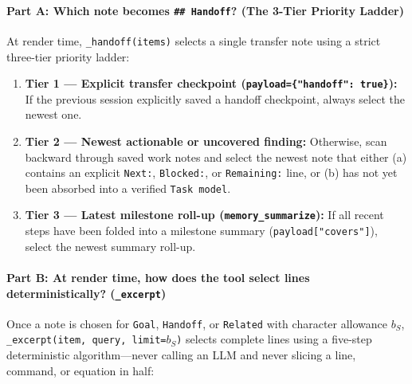 \documentclass[11pt,a4paper]{article}
\begin{document}
\paragraph{Part A: Which note becomes \texttt{\#\# Handoff}? (The 3-Tier Priority Ladder)}
At render time, \texttt{\_handoff(items)} selects a single transfer note using a strict three-tier priority ladder:
\begin{enumerate}[leftmargin=1.6em,itemsep=2pt]
  \item \textbf{Tier 1 --- Explicit transfer checkpoint (\texttt{payload=\{"handoff": true\}}):} If the previous session explicitly saved a handoff checkpoint, always select the newest one.
  \item \textbf{Tier 2 --- Newest actionable or uncovered finding:} Otherwise, scan backward through saved work notes and select the newest note that either (a) contains an explicit \texttt{Next:}, \texttt{Blocked:}, or \texttt{Remaining:} line, or (b) has not yet been absorbed into a verified \texttt{Task model}.
  \item \textbf{Tier 3 --- Latest milestone roll-up (\texttt{memory\_summarize}):} If all recent steps have been folded into a milestone summary (\texttt{payload["covers"]}), select the newest summary roll-up.
\end{enumerate}

\paragraph{Part B: At render time, how does the tool select lines deterministically? (\texttt{\_excerpt})}
Once a note is chosen for \texttt{Goal}, \texttt{Handoff}, or \texttt{Related} with character allowance $b_S$, \texttt{\_excerpt(item, query, limit=$b_S$)} selects complete lines using a five-step deterministic algorithm---never calling an LLM and never slicing a line, command, or equation in half:
\end{document}
